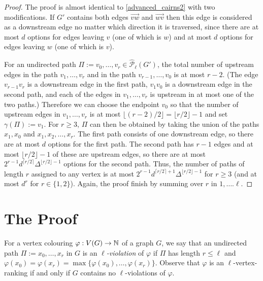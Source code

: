 \documentclass{patmorin}
\newcommand{\defin}[1]{\emph{\color{brightmaroon}#1}}
\begin{document}
\begin{proof}
  The proof is almost identical to \cref{advanced_cairns2} with two modifications.  If $G'$ contains both edges $\overrightarrow{vw}$ and $\overrightarrow{wv}$ then this edge is considered as a downstream edge no matter which direction it is traversed, since there are at most $d$ options for edges leaving $v$ (one of which is $w$) and at most $d$ options for edges leaving $w$ (one of which is $v$).

  For an undirected path $\Pi:=v_0,\ldots,v_r\in\widehat{\mathcal{P}}_\ell(G')$, the total number of upstream edges in the path $v_1,\ldots,v_r$ and in the path $v_{r-1},\ldots,v_0$ is at most $r-2$. (The edge $v_{r-1}v_r$ is a downstream edge in the first path, $v_1v_0$ is a downstream edge in the second path, and each of the edges in $v_1,\ldots,v_r$ is upstream in at most one of the two paths.)  Therefore we can choose the endpoint $v_0$ so that the number of upstream edges in $v_1,\ldots,v_r$ is at most $\lfloor (r-2)/2\rfloor=\lfloor r/2\rfloor-1$ and set $\gamma(\Pi):=v_1$. For $r\ge 3$, $\Pi$ can then be obtained by taking the union of the paths $x_1,x_0$ and $x_1,x_2,\ldots,x_r$.  The first path consists of one downstream edge, so there are at most $d$ options for the first path.  The second path has $r-1$ edges and at most $\lfloor r/2\rfloor-1$ of these are upstream edges, so there are at most $2^{r-1}d^{\lceil r/2\rceil}\Delta^{\lfloor r/2\rfloor-1}$ options for the second path.
   Thus, the number of paths of length $r$ assigned to any vertex is at most $2^{r-1}d^{\lceil r/2\rceil+1}\Delta^{\lfloor r/2\rfloor-1}$ for $r\ge 3$ (and at most $d^r$ for $r\in\{1,2\}$). Again, the proof finish by summing over $r$ in $1,\ldots.\ell$.
\end{proof}


\section{The Proof}
\label{the_proof}

For a vertex colouring $\varphi:V(G)\to\mathbb{N}$ of a graph $G$, we say that an undirected path $\Pi:=x_0,\ldots,x_r$ in $G$ is an \defin{$\ell$-violation} of $\varphi$ if $\Pi$ has length $r\le\ell$ and $\varphi(x_0)=\varphi(x_r)=\max\{\varphi(x_0),\ldots,\varphi(x_r)\}$.  Observe that $\varphi$ is an $\ell$-vertex-ranking if and only if $G$ contains no $\ell$-violations of $\varphi$.
\end{document}
